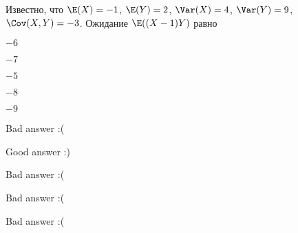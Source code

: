 
\begin{question}
Известно, что \(\E(X)=-1\), \(\E(Y)=2\), \(\Var(X)=4\), \(\Var(Y)=9\),
\(\Cov(X,Y)=-3\). Ожидание \(\E((X-1)Y)\) равно
\begin{answerlist}
  \item \(-6\)
  \item \(-7\)
  \item \(-5\)
  \item \(-8\)
  \item \(-9\)
\end{answerlist}
\end{question}

\begin{solution}
\begin{answerlist}
  \item Bad answer :(
  \item Good answer :)
  \item Bad answer :(
  \item Bad answer :(
  \item Bad answer :(
\end{answerlist}
\end{solution}

